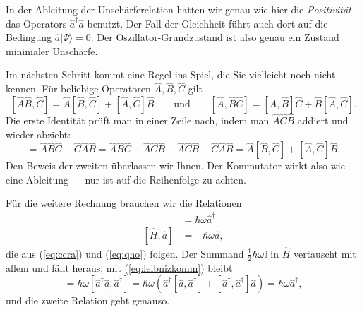 In der Ableitung der Unschärferelation hatten wir genau wie hier die \emph{Positivität} das Operators $\widehat{a}^\dag \widehat{a}$ benutzt. Der Fall der Gleichheit führt auch dort auf die Bedingung $\widehat{a}|\Psi\rangle = 0$. Der Oszillator-Grundzustand ist also genau ein Zustand minimaler Unschärfe.

\begin{greybox}
Im nächsten Schritt kommt eine Regel ins Spiel, die Sie vielleicht noch nicht kennen. Für beliebige Operatoren $\widehat{A}, \widehat{B}, \widehat{C}$ gilt
\begin{equation}\label{eq:leibnizkomm}
	[\widehat{A}\widehat{B},\widehat{C}] = \widehat{A}[\widehat{B},\widehat{C}] + [\widehat{A},\widehat{C}]\widehat{B}
	\qquad \text{und} \qquad
	[\widehat{A},\widehat{B}\widehat{C}] = [\widehat{A},\widehat{B}]\widehat{C} + \widehat{B}[\widehat{A},\widehat{C}].
\end{equation}
Die erste Identität prüft man in einer Zeile nach, indem man $\widehat{A}\widehat{C}\widehat{B}$ addiert und wieder abzieht:
\begin{equation}
	[\widehat{A}\widehat{B},\widehat{C}] = \widehat{A}\widehat{B}\widehat{C} - \widehat{C}\widehat{A}\widehat{B}
	= \widehat{A}\widehat{B}\widehat{C} - \widehat{A}\widehat{C}\widehat{B} + \widehat{A}\widehat{C}\widehat{B} - \widehat{C}\widehat{A}\widehat{B}
	= \widehat{A}[\widehat{B},\widehat{C}] + [\widehat{A},\widehat{C}]\widehat{B}.
\end{equation}
Den Beweis der zweiten überlassen wir Ihnen. Der Kommutator wirkt also wie eine Ableitung --- nur ist auf die Reihenfolge zu achten.
\end{greybox}

Für die weitere Rechnung brauchen wir die Relationen
\begin{align}
	[\widehat{H},\widehat{a}^\dag] &= \hbar \omega \widehat{a}^\dag \\
	[\widehat{H},\widehat{a}] &= -\hbar \omega \widehat{a}, 
\end{align}
die aus (\ref{eq:ccra}) und (\ref{eq:qho}) folgen. Der Summand $\tfrac{1}{2}\hbar\omega\mathbb{I}$ in $\widehat{H}$ vertauscht mit allem und fällt heraus; mit (\ref{eq:leibnizkomm}) bleibt
\begin{equation}
	[\widehat{H},\widehat{a}^\dag] = \hbar\omega[\widehat{a}^\dag\widehat{a},\widehat{a}^\dag]
	= \hbar\omega\left(\widehat{a}^\dag[\widehat{a},\widehat{a}^\dag] + [\widehat{a}^\dag,\widehat{a}^\dag]\widehat{a}\right)
	= \hbar\omega \widehat{a}^\dag,
\end{equation}
und die zweite Relation geht genauso.

